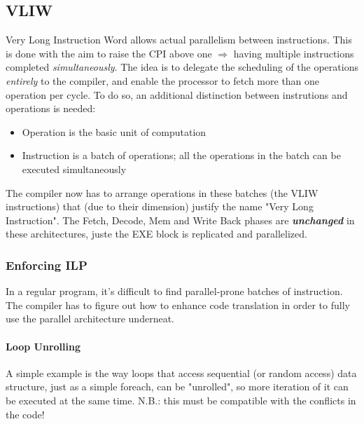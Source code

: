 \documentclass[10pt,a4paper]{article}
\begin{document}
			\subsection{VLIW}
				Very Long Instruction Word allows actual parallelism between instructions. This is done with the aim to raise the CPI above one $\Rightarrow$ having multiple instructions completed \emph{simultaneously}. The idea is to delegate the scheduling of the operations \emph{entirely} to the compiler, and enable the processor to fetch more than one operation per cycle. To do so, an additional distinction between instrutions and operations is needed:
				\begin{itemize}
					\item Operation is the basic unit of computation
					\item Instruction is a batch of operations; all the operations in the batch can be executed simultaneously
				\end{itemize}
				The compiler now has to arrange operations in these batches (the VLIW instructions) that (due to their dimension) justify the name "Very Long Instruction". The Fetch, Decode, Mem and Write Back phases are \textbf{\emph{unchanged}} in these architectures, juste the EXE block is replicated and parallelized.
				
				\subsubsection{Enforcing ILP}
					In a regular program, it's difficult to find parallel-prone batches of instruction. The compiler has to figure out how to enhance code translation in order to fully use the parallel architecture underneat.
					
					\paragraph{Loop Unrolling}
						A simple example is the way loops that access sequential (or random access) data structure, just as a simple foreach, can be "unrolled", so more iteration of it can be executed at the same time. N.B.: this must be compatible with the conflicts in the code!
						
\end{document}
